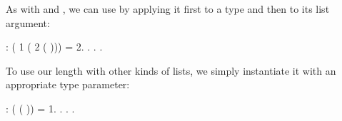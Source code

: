 \documentclass[12pt]{report}
\begin{document}
    As with  and , we can use  by applying it first
    to a type and then to its list argument: \begin{coqdoccode}
\coqdocemptyline
\coqdocnoindent
{}  :\coqdoceol
\coqdocindent{2.00em}
  (  1 (  2 ( ))) = 2.\coqdoceol
\coqdocnoindent
{}. . .\coqdoceol
\coqdocemptyline
\end{coqdoccode}
To use our length with other kinds of lists, we simply
    instantiate it with an appropriate type parameter: \begin{coqdoccode}
\coqdocemptyline
\coqdocnoindent
{}  :\coqdoceol
\coqdocindent{2.00em}
  (   ( )) = 1.\coqdoceol
\coqdocnoindent
{}. . .\coqdoceol
\coqdocemptyline
\end{coqdoccode}
\subsubsection{ }
\end{document}
